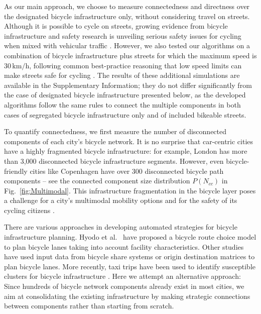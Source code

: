As our main approach, we choose to measure connectedness and directness over the designated bicycle infrastructure only, without considering travel on streets. Although it is possible to cycle on streets, growing evidence from bicycle infrastructure and safety research is unveiling serious safety issues for cycling when mixed with vehicular traffic \cite{Reynolds2009impact,Teschke2012route,Pucher2016Safer}. However, we also tested our algorithms on a combination of bicycle infrastructure plus streets for which the maximum speed is $30\,\mathrm{km/h}$, following common best-practice reasoning that low speed limits can make streets safe for cycling \cite{global2016global}. The results of these additional simulations are available in the Supplementary Information; they do not differ significantly from the case of designated bicycle infrastructure presented below, as the developed algorithms follow the same rules to connect the multiple components in both cases of segregated bicycle infrastructure only and of included bikeable streets.

To quantify connectedness, we first measure the number of disconnected components of each city's bicycle network. It is no surprise that car-centric cities have a highly fragmented bicycle infrastructure: for example, London has more than 3,000 disconnected bicycle infrastructure segments. However, even bicycle-friendly cities like Copenhagen have over 300 disconnected bicycle path components -- see the connected component size distribution $P( N_{cc} )$ in Fig.~\ref{fig:Multimodal}. This infrastructure fragmentation in the bicycle layer poses a challenge for a city's multimodal mobility options \cite{natera2020multimodal} and for the safety of its cycling citizens \cite{Dill2009infrastructure,Chataway2014Safety}.

There are various approaches in developing automated strategies for bicycle infrastructure planning. Hyodo et al.~\cite{Hyodo2000Modeling} have proposed a bicycle route choice model to plan bicycle lanes taking into account facility characteristics. Other studies have used input data from bicycle share systems \cite{Bao2017Planning} or origin destination matrices \cite{Mauttone2017Design} to plan bicycle lanes. More recently, taxi trips have been used to identify susceptible clusters for bicycle infrastructure \cite{Akbarzadeh2018Design}. Here we attempt an alternative approach: Since hundreds of bicycle network components already exist in most cities, we aim at consolidating the existing infrastructure by making strategic connections between components rather than starting from scratch.

